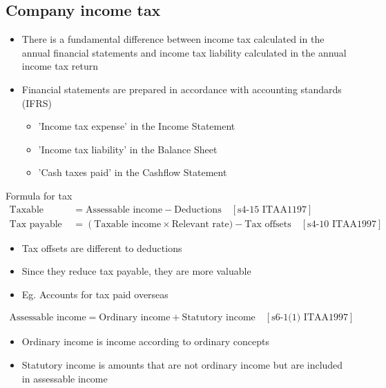 \documentclass{article}
\begin{document}
	\subsection{Company income tax}
		\begin{itemize}
			\item There is a fundamental difference between income tax calculated in the annual financial statements and income tax liability calculated in the annual income tax return
			\item Financial statements are prepared in accordance with accounting standards (IFRS)
				\begin{itemize}
					\item 'Income tax expense' in the Income Statement
					\item 'Income tax liability' in the Balance Sheet
					\item 'Cash taxes paid' in the Cashflow Statement
				\end{itemize}
		\end{itemize}
		\begin{question}{Formula for tax}
			\begin{align*}
				\text{Taxable income} &= \text{Assessable income} - \text{Deductions} \quad \left[\text{s4-15 ITAA1197}\right]	\\
				\text{Tax payable} &= \left(\text{Taxable income} \times \text{Relevant rate}) - \text{Tax offsets} \quad \left[\text{s4-10 ITAA1997}\right]
			\end{align*}
		\end{question}
		\begin{itemize}
			\item Tax offsets are different to deductions
			\item Since they reduce tax payable, they are more valuable
			\item Eg. Accounts for tax paid overseas
		\end{itemize}
		\begin{align*}
			\text{Assessable income} = \text{Ordinary income} + \text{Statutory income} \quad \left[\text{s6-1(1) ITAA1997}\right]
		\end{align*}
		\begin{itemize}
			\item Ordinary income is income according to ordinary concepts
			\item Statutory income is amounts that are not ordinary income but are included in assessable income
		\end{itemize}
\end{document}
